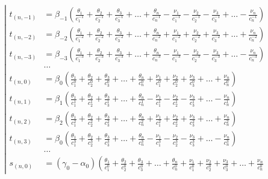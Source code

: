 \begin{equation*} \left| \begin{aligned}
t_{(n,-1)} &=
  \beta_{-1}
  \left(
  \frac{\theta_1}{c_1^{-1}}
+ \frac{\theta_2}{c_2^{-1}}
+ \frac{\theta_3}{c_3^{-1}}
+ \ldots
+ \frac{\theta_n}{c_n^{-1}}
- \frac{\nu_1}{c_1^{-1}}
- \frac{\nu_2}{c_2^{-1}}
- \frac{\nu_3}{c_3^{-1}}
+ \ldots
- \frac{\nu_n}{c_n^{-1}}
  \right) \\
%
t_{(n,-2)} &=
  \beta_{-2}
  \left(
  \frac{\theta_1}{c_1^{-2}}
+ \frac{\theta_2}{c_2^{-2}}
+ \frac{\theta_3}{c_3^{-2}}
+ \ldots
+ \frac{\theta_n}{c_n^{-2}}
+ \frac{\nu_1}{c_1^{-2}}
+ \frac{\nu_2}{c_2^{-2}}
+ \frac{\nu_3}{c_3^{-2}}
+ \ldots
+ \frac{\nu_n}{c_n^{-2}}
  \right) \\
%
t_{(n,-3)} &=
  \beta_{-3}
  \left(
  \frac{\theta_1}{c_1^{-3}}
+ \frac{\theta_2}{c_2^{-3}}
+ \frac{\theta_3}{c_3^{-3}}
+ \ldots
+ \frac{\theta_n}{c_n^{-3}}
- \frac{\nu_1}{c_1^{-3}}
- \frac{\nu_2}{c_2^{-3}}
- \frac{\nu_3}{c_3^{-3}}
+ \ldots
- \frac{\nu_n}{c_n^{-3}}
  \right) \\
%
&\ldots \\
%
t_{(n,0)} &=
  \beta_0
  \left(
  \frac{\theta_1}{c_1^0}
+ \frac{\theta_2}{c_2^0}
+ \frac{\theta_3}{c_3^0}
+ \ldots
+ \frac{\theta_n}{c_n^0}
+ \frac{\nu_1}{c_1^0}
+ \frac{\nu_2}{c_2^0}
+ \frac{\nu_3}{c_3^0}
+ \ldots
+ \frac{\nu_n}{c_n^0}
  \right) \\
%
t_{(n,1)} &=
  \beta_1
  \left(
  \frac{\theta_1}{c_1^1}
+ \frac{\theta_2}{c_2^1}
+ \frac{\theta_3}{c_3^1}
+ \ldots
+ \frac{\theta_n}{c_n^1}
- \frac{\nu_1}{c_1^1}
- \frac{\nu_2}{c_2^1}
- \frac{\nu_3}{c_3^1}
+ \ldots
- \frac{\nu_n}{c_n^1}
  \right) \\
%
t_{(n,2)} &=
  \beta_2
  \left(
  \frac{\theta_1}{c_1^2}
+ \frac{\theta_2}{c_2^2}
+ \frac{\theta_3}{c_3^2}
+ \ldots
+ \frac{\theta_n}{c_n^2}
+ \frac{\nu_1}{c_1^2}
+ \frac{\nu_2}{c_2^2}
+ \frac{\nu_3}{c_3^2}
+ \ldots
+ \frac{\nu_n}{c_n^2}
  \right) \\
%
t_{(n,3)} &=
  \beta_0
  \left(
  \frac{\theta_1}{c_1^3}
+ \frac{\theta_2}{c_2^3}
+ \frac{\theta_3}{c_3^3}
+ \ldots
+ \frac{\theta_n}{c_n^3}
- \frac{\nu_1}{c_1^3}
- \frac{\nu_2}{c_2^3}
- \frac{\nu_3}{c_3^3}
+ \ldots
- \frac{\nu_n}{c_n^3}
  \right) \\
%
&\ldots \\
%
s_{(n,0)} &=
  (\gamma_0 - \alpha_0)
  \left(
  \frac{\theta_1}{c_1^0}
+ \frac{\theta_2}{c_2^0}
+ \frac{\theta_3}{c_3^0}
+ \ldots
+ \frac{\theta_n}{c_n^0}
+ \frac{\nu_1}{c_1^0}
+ \frac{\nu_2}{c_2^0}
+ \frac{\nu_3}{c_3^0}
+ \ldots
+ \frac{\nu_n}{c_n^0}

\end{aligned}
\end{equation*}
